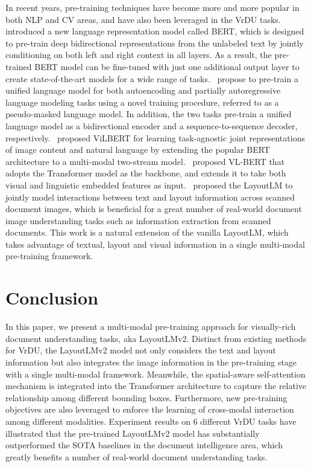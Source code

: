 \documentclass{article} \usepackage{iclr2021_conference,times}
\begin{document}
In recent years, pre-training techniques have become more and more popular in both NLP and CV areas, and have also been leveraged in the VrDU tasks.~\cite{devlin-etal-2019-bert} introduced a new language representation model called BERT, which is designed to pre-train deep bidirectional representations from the unlabeled text by jointly conditioning on both left and right context in all layers. As a result, the pre-trained BERT model can be fine-tuned with just one additional output layer to create state-of-the-art models for a wide range of tasks.~\cite{bao2020unilmv2} propose to pre-train a unified language model for both autoencoding and partially autoregressive language modeling tasks using a novel training procedure, referred to as a pseudo-masked language model. In addition, the two tasks pre-train a unified language model as a bidirectional encoder and a sequence-to-sequence decoder, respectively.~\cite{lu2019vilbert} proposed ViLBERT for learning task-agnostic joint representations of image content and natural language by extending the popular BERT architecture to a multi-modal two-stream model.~\cite{su2020vlbert} proposed VL-BERT that adopts the Transformer model as the backbone, and extends it to take both visual and linguistic embedded features as input.~\citep{10.1145/3394486.3403172} proposed the LayoutLM to jointly model interactions between text and layout information across scanned document images, which is beneficial for a great number of real-world document image understanding tasks such as information extraction from scanned documents. This work is a natural extension of the vanilla LayoutLM, which takes advantage of textual, layout and visual information in a single multi-modal pre-training framework.



\section{Conclusion}

In this paper, we present a multi-modal pre-training approach for visually-rich document understanding tasks, aka LayoutLMv2. Distinct from existing methods for VrDU, the LayoutLMv2 model not only considers the text and layout information but also integrates the image information in the pre-training stage with a single multi-modal framework. Meanwhile, the spatial-aware self-attention mechanism is integrated into the
Transformer architecture to capture the relative relationship among different bounding boxes. Furthermore, new pre-training objectives are also leveraged to enforce the learning of cross-modal interaction among different modalities. Experiment results on 6 different VrDU tasks have illustrated that the pre-trained LayoutLMv2 model has substantially outperformed the SOTA baselines in the document intelligence area, which greatly benefits a number of real-world document understanding tasks.
\end{document}
